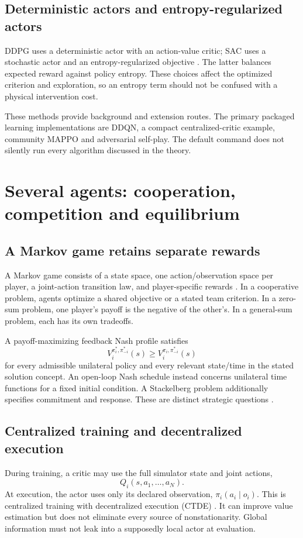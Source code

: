 \documentclass[11pt,a4paper]{article}
\theoremstyle{definition}
\theoremstyle{remark}
\begin{document}
\subsection{Deterministic actors and entropy-regularized actors}
DDPG uses a deterministic actor with an action-value critic; SAC uses a stochastic actor and an entropy-regularized objective \cite{ddpg,sac}. The latter balances expected reward against policy entropy. These choices affect the optimized criterion and exploration, so an entropy term should not be confused with a physical intervention cost.

These methods provide background and extension routes. The primary packaged learning implementations are DDQN, a compact centralized-critic example, community MAPPO and adversarial self-play. The default command does not silently run every algorithm discussed in the theory.

\section{Several agents: cooperation, competition and equilibrium}
\subsection{A Markov game retains separate rewards}
A Markov game consists of a state space, one action/observation space per player, a joint-action transition law, and player-specific rewards \cite{littman}. In a cooperative problem, agents optimize a shared objective or a stated team criterion. In a zero-sum problem, one player's payoff is the negative of the other's. In a general-sum problem, each has its own tradeoffs.

A payoff-maximizing feedback Nash profile satisfies
\begin{equation}
V_i^{\pi_i^*,\pi_{-i}^*}(s)\ge
V_i^{\pi_i,\pi_{-i}^*}(s)
\end{equation}
for every admissible unilateral policy and every relevant state/time in the stated solution concept. An open-loop Nash schedule instead concerns unilateral time functions for a fixed initial condition. A Stackelberg problem additionally specifies commitment and response. These are distinct strategic questions \cite{basar}.

\subsection{Centralized training and decentralized execution}
During training, a critic may use the full simulator state and joint actions,
\begin{equation}
Q_i(s,a_1,\ldots,a_N).
\end{equation}
At execution, the actor uses only its declared observation,
$\pi_i(a_i\mid o_i)$. This is centralized training with decentralized execution (CTDE) \cite{maddpg}. It can improve value estimation but does not eliminate every source of nonstationarity. Global information must not leak into a supposedly local actor at evaluation.
\end{document}
